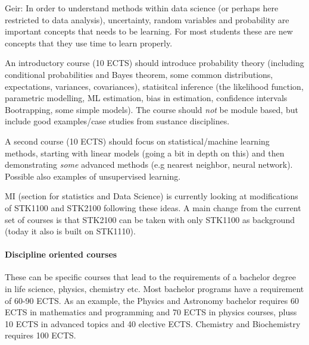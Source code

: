 \documentclass[oneside,final,10pt]{article}
\begin{document}
Geir: In order to understand methods within data science (or perhaps here restricted to data analysis), uncertainty, random variables and probability are important concepts that needs to be learning. For most students these are new concepts that they use time to learn properly. 

An introductory course (10 ECTS) should introduce probability theory (including conditional probabilities and Bayes theorem, some common distributions, expectations, variances, covariances), statisitcal inference (the likelihood function, parametric modelling, ML estimation, bias in estimation, confidence intervals Bootrapping, some simple models). The course should \emph{not} be module based, but include good examples/case studies from sustance disciplines.

A second course (10 ECTS) should focus on statistical/machine learning methods, starting with linear models (going a bit in depth on this) and then demonstrating \emph{some} advanced methods (e.g nearest neighbor, neural network). Possible also examples of unsupervised learning.

MI (section for statistics and Data Science) is currently looking at modifications of STK1100 and STK2100 following these ideas. A main change from the current set of courses is that STK2100 can be taken with only STK1100 as background (today it also is built on STK1110).

\paragraph{Discipline oriented courses}

These can be specific courses that lead to the requirements of a bachelor degree in life science, physics, chemistry etc. Most bachelor programs have a requirement of 60-90 ECTS. As an example, the Physics and Astronomy bachelor requires 60 ECTS in mathematics and programming and 70 ECTS in physics courses, pluss 10 ECTS in advanced topics and 40 elective ECTS.  
Chemistry and Biochemistry requires 100 ECTS. 
\end{document}
